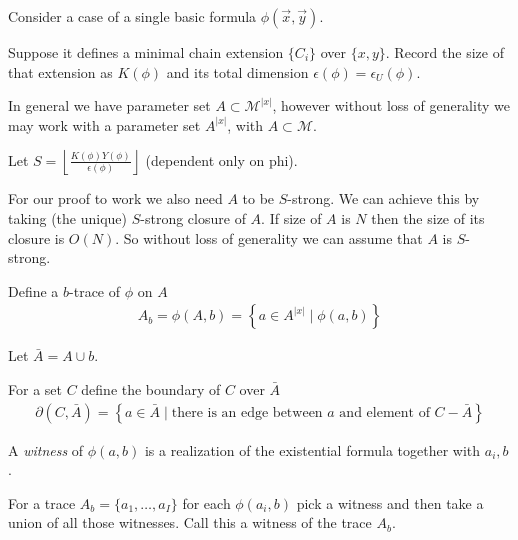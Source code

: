 \documentclass{amsart}
\newcommand{\MM}{\mathscr M}
\newcommand{\curly}[1]{\left\{#1\right\}}
\providecommand{\floor}[1]{\left \lfloor #1 \right \rfloor }
\begin{document}


Consider a case of a single basic formula $\phi(\vec x, \vec y)$.

Suppose it defines a minimal chain extension $\{C_i\}$ over $\{x, y\}$. 
Record the size of that extension as $K(\phi)$ and its total dimension $\epsilon(\phi) = \epsilon_U(\phi)$.

In general we have parameter set $A \subset \MM^{|x|}$, however without loss of generality we may work with
a parameter set $A^{|x|}$, with $A \subset \MM$.

Let $S = \floor{\frac{K(\phi)Y(\phi)}{\epsilon(\phi)}}$ (dependent only on phi).

For our proof to work we also need $A$ to be $S$-strong.
We can achieve this by taking (the unique) $S$-strong closure of $A$.
If size of $A$ is $N$ then the size of its closure is $O(N)$.	%
So without loss of generality we can assume that $A$ is $S$-strong.

\begin{Definition}
	Define a $b$-trace of $\phi$ on $A$
	\begin{align*}
		A_b = \phi(A, b) = \curly{a \in A^{|x|} \mid \phi(a, b)}
	\end{align*}
\end{Definition}

Let $\bar A = A \cup b$. %

\begin{Definition}
	For a set $C$ define the boundary of $C$ over $\bar A$
	\begin{align*}
		\partial(C, \bar A) = \curly{a \in \bar A \mid \text{there is an edge between $a$ and element of $C - \bar A$}}
	\end{align*}
\end{Definition}

\begin{Definition}
	A \emph{witness} of $\phi(a, b)$ is a realization of the existential formula together with ${a_i, b}$.
\end{Definition}

\begin{Definition}
	For a trace $A_b = \{a_1, \ldots, a_I\}$ for each $\phi(a_i, b)$ pick a witness and then take a union of all those witnesses. Call this a witness of the trace $A_b$.	%
\end{Definition}
\end{document}
